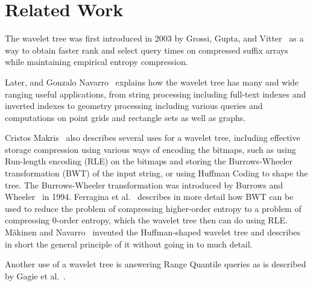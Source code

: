 \section{Related Work}
The wavelet tree was first introduced in 2003 by Grossi, Gupta, and Vitter~\cite[Section 4.2]{Grossi:2003:HET:644108.644250} as a way to obtain faster rank and select query times on compressed suffix arrays while maintaining empirical entropy compression.

Later, and Gonzalo Navarro~\cite{Navjda13} explains how the wavelet tree has many and wide ranging useful applications, from string processing including full-text indexes and inverted indexes to geometry processing including various queries and computations on point grids and rectangle sets as well as graphs.

Cristos Makris~\citep{WTSurvey} also describes several uses for a wavelet tree, including effective storage compression using various ways of encoding the bitmaps, such as using Run-length encoding (RLE) on the bitmaps and storing the Burrows-Wheeler transformation (BWT) of the input string, or using Huffman Coding to shape the tree.
The Burrows-Wheeler transformation was introduced by Burrows and Wheeler~\citep{BWToriginalArticle} in 1994.
Ferragina et al.~\citep{waveletTreeEntropy} describes in more detail how BWT can be used to reduce the problem of compressing higher-order entropy to a problem of compressing 0-order entropy, which the wavelet tree then can do using RLE.
Mäkinen and Navarro~\citep[Section~4]{FMcountOnBWT} invented the Huffman-shaped wavelet tree and describes in short the general principle of it without going in to much detail.

Another use of a wavelet tree is answering Range Quantile queries as is described by Gagie et al.~\citep[Section 3]{RangeQuantileQueryWT}.

